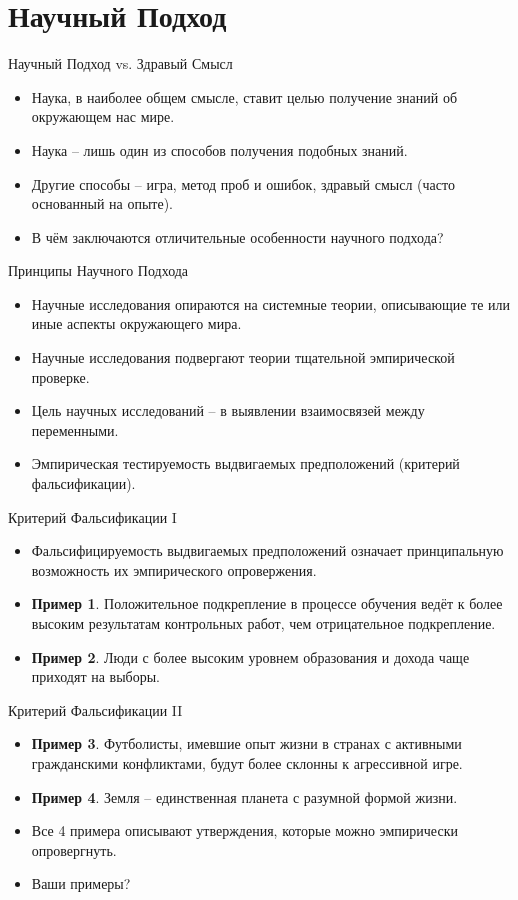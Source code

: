 \documentclass{beamer}
\begin{document}
\section{Научный Подход}
\begin{frame}{Научный Подход vs.  Здравый Смысл}
\begin{itemize}
	\setlength\itemsep{2em}
	\item Наука, в наиболее общем смысле, ставит целью получение знаний об окружающем нас мире. 
	\item Наука -- лишь один из способов получения подобных знаний.
	\item Другие способы -- игра,  метод проб и ошибок,  здравый смысл (часто основанный на опыте). 
	\item В чём заключаются отличительные особенности  научного подхода? 
\end{itemize}
\end{frame}
\begin{frame}{Принципы Научного Подхода}
\begin{itemize}
	\setlength\itemsep{2em}
	\item Научные исследования опираются на системные теории,  описывающие те или иные аспекты окружающего мира.
	\item Научные исследования подвергают теории тщательной эмпирической проверке.  
	\item Цель научных исследований -- в выявлении взаимосвязей между переменными. 
	\item Эмпирическая тестируемость выдвигаемых предположений (критерий фальсификации).
\end{itemize}
\end{frame}
\begin{frame}{Критерий Фальсификации I}
\begin{itemize}
	\setlength\itemsep{2em}
	\item Фальсифицируемость выдвигаемых предположений означает принципальную возможность их эмпирического опровержения. 
	\item \textbf{Пример 1}.  Положительное подкрепление в процессе обучения ведёт к более высоким результатам контрольных работ,  чем отрицательное подкрепление.  
	\item \textbf{Пример 2}.  Люди с более высоким уровнем образования и дохода чаще приходят на выборы.  
\end{itemize}
\end{frame}
\begin{frame}{Критерий Фальсификации II}
\begin{itemize}
	\setlength\itemsep{2em}
	\item \textbf{Пример 3}.  Футболисты,  имевшие опыт жизни в странах с активными гражданскими конфликтами,  будут более склонны к агрессивной игре. 
	\item \textbf{Пример 4}.  Земля -- единственная планета с разумной формой жизни.
	\item Все 4 примера описывают утверждения,  которые можно эмпирически опровергнуть. 
	\item Ваши примеры? 
\end{itemize}
\end{frame}
\end{document}
